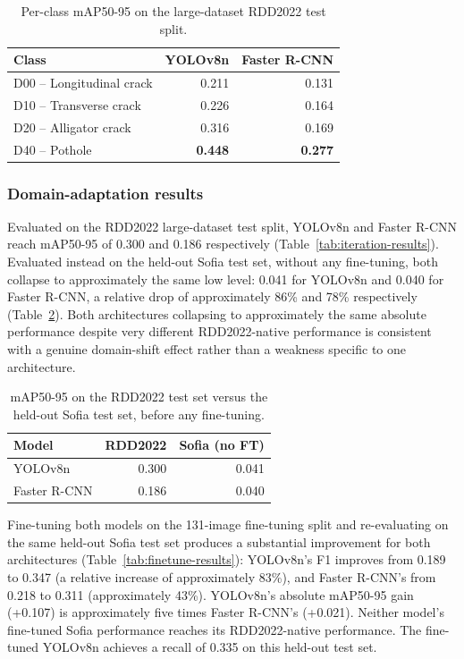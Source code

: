 \documentclass[10pt,a4paper,twocolumn]{article}
\begin{document}
\begin{table}[t]
  \centering
  \small
  \caption{Per-class mAP50-95 on the large-dataset RDD2022 test split.}
  \label{tab:per-class}
  \begin{tabular}{@{}lrr@{}}
    \toprule
    Class & YOLOv8n & Faster R-CNN \\
    \midrule
    D00 -- Longitudinal crack & 0.211 & 0.131 \\
    D10 -- Transverse crack   & 0.226 & 0.164 \\
    D20 -- Alligator crack    & 0.316 & 0.169 \\
    D40 -- Pothole            & \textbf{0.448} & \textbf{0.277} \\
    \bottomrule
  \end{tabular}
\end{table}

\subsubsection{Domain-adaptation results}
\label{sec:res-domain-adaptation}

Evaluated on the RDD2022 large-dataset test split, YOLOv8n and Faster
R-CNN reach mAP50-95 of 0.300 and 0.186 respectively
(Table~\ref{tab:iteration-results}). Evaluated instead on the held-out
Sofia test set, without any fine-tuning, both collapse to approximately
the same low level: 0.041 for YOLOv8n and 0.040 for Faster R-CNN, a
relative drop of approximately 86\% and 78\% respectively
(Table~\ref{tab:domain-gap}). Both architectures collapsing to
approximately the same absolute performance despite very different
RDD2022-native performance is consistent with a genuine domain-shift
effect rather than a weakness specific to one architecture.

\begin{table}[t]
  \centering
  \footnotesize
  \caption{mAP50-95 on the RDD2022 test set versus the held-out Sofia test
  set, before any fine-tuning.}
  \label{tab:domain-gap}
  \begin{tabular}{@{}lrr@{}}
    \toprule
    Model & RDD2022 & Sofia (no FT) \\
    \midrule
    YOLOv8n       & 0.300 & 0.041 \\
    Faster R-CNN  & 0.186 & 0.040 \\
    \bottomrule
  \end{tabular}
\end{table}

Fine-tuning both models on the 131-image fine-tuning split and
re-evaluating on the same held-out Sofia test set produces a substantial
improvement for both architectures (Table~\ref{tab:finetune-results}):
YOLOv8n's F1 improves from 0.189 to 0.347 (a relative increase of
approximately 83\%), and Faster R-CNN's from 0.218 to 0.311 (approximately
43\%). YOLOv8n's absolute mAP50-95 gain (+0.107) is approximately five
times Faster R-CNN's (+0.021). Neither model's fine-tuned Sofia
performance reaches its RDD2022-native performance. The fine-tuned
YOLOv8n achieves a recall of 0.335 on this held-out test set.
\end{document}

